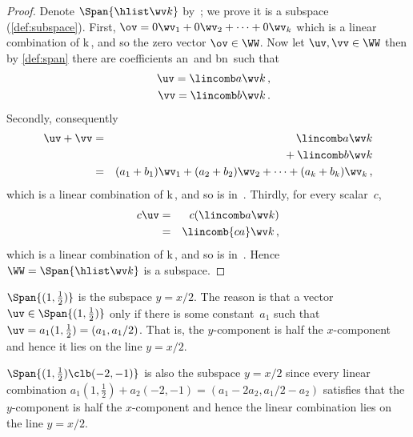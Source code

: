 \begin{proof}
Denote \(\Span\{\hlist\wv k\}\) by~\WW; we prove it is a subspace (\cref{def:subspace}).
First, \(\ov=0\wv_1+0\wv_2+\cdots+0\wv_k\) which is a linear combination of \hlist\wv k\,, and so the zero vector \(\ov\in\WW\).
Now let \(\uv,\vv\in\WW\) then by \cref{def:span} there are coefficients \hlist an\ and \hlist bn\ such that
\begin{eqnarray*}
&&\uv=\lincomb a\wv k\,,
\\&&\vv=\lincomb b\wv k\,.
\end{eqnarray*}
Secondly, consequently
\begin{eqnarray*}
\uv+\vv&=&
\lincomb a\wv k
\\&&{}+\lincomb b\wv k
\\&=&(a_1+b_1)\wv_1+(a_2+b_2)\wv_2+\cdots+(a_k+b_k)\wv_k\,,
\end{eqnarray*}
which is a linear combination of \hlist\wv k\,, and so is in~\WW.
Thirdly, for every scalar~\(c\),
\begin{eqnarray*}
c\uv&=&c(\lincomb a\wv k)
\\&=&\lincomb {ca}\wv k\,,
\end{eqnarray*}
which is a linear combination of \hlist\wv k\,, and so is in~\WW.
Hence \(\WW=\Span\{\hlist\wv k\}\) is a subspace.
\end{proof}


\begin{example} \label{eg:1x2subs}
\(\Span\{(1,\frac12)\}\) is the subspace \(y=x/2\).
The reason is that a vector \(\uv\in\Span\{(1,\frac12)\}\) only if there is some constant~\(a_1\) such that \(\uv=a_1(1,\frac12)=(a_1,a_1/2)\).
That is, the \(y\)-component is half the \(x\)-component and hence it lies on the line \(y=x/2\).

\(\Span\{(1,\frac12)\clb (-2,-1)\}\) is also the subspace \(y=x/2\) since every linear combination \(a_1(1,\frac12)+a_2(-2,-1)=(a_1-2a_2,a_1/2-a_2)\) satisfies that the \(y\)-component is half the \(x\)-component and hence the linear combination lies on the line \(y=x/2\).
\end{example}


